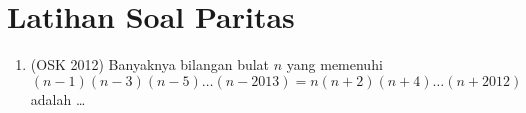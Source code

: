 \documentclass[12pt, letter]{scrartcl}
\begin{document}
    
    
    
    


\section{Latihan Soal Paritas}
\begin{enumerate}
\item (OSK 2012) Banyaknya bilangan bulat $n$ yang memenuhi $$(n-1)(n-3)(n-5)\dots(n-2013)=n(n+2)(n+4)\dots (n+2012)$$ adalah \dots
\end{enumerate}
\end{document}
